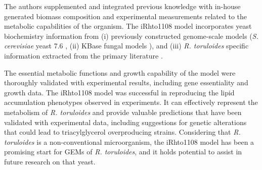 The authors supplemented and integrated previous knowledge with in-house generated biomass composition and experimental
measurements related to the metabolic capabilities of the organism. 
The iRhto1108 model incorporates yeast biochemistry information from (i) previously constructed genome-scale models (\textit{S. cerevisiae} yeast 7.6 \cite{Aung2013}, (ii) KBase fungal
models \cite{Arkin2018}), and (iii) \textit{R. toruloides} specific information
extracted from the primary literature \cite{Coradetti2018}\cite{Jagtap2017}\cite{Kot2018}. 




The essential metabolic functions and growth capability of the model were thoroughly validated with experimental results, including gene essentiality \cite{Coradetti2018} and growth data. The iRhto1108 model was successful in reproducing the lipid accumulation phenotypes observed in experiments. It can effectively represent the metabolism of \textit{R. toruloides} and provide valuable predictions that have been validated with experimental data, including suggestions for genetic alterations that could lead to triacylglycerol overproducing strains. \cite{Dinh2019} Considering that \textit{R. toruloides} is a non-conventional microorganism, the iRhto1108 model has been a promising start for GEMs of \textit{R. toruloides}, and it holds potential to assist in future research on that yeast. 

